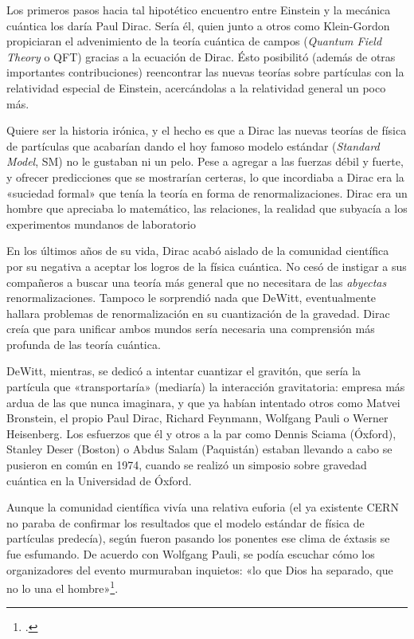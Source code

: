 \documentclass[11pt,a4paper,titlepage]{article}
\begin{document}
\par Los primeros pasos hacia tal hipotético encuentro entre Einstein y la mecánica cuántica los daría Paul Dirac. Sería él, quien junto a otros como Klein-Gordon propiciaran el advenimiento de la teoría cuántica de campos (\textit{Quantum Field Theory} o QFT) gracias a la ecuación de Dirac. Ésto posibilitó (además de otras importantes contribuciones) reencontrar las nuevas teorías sobre partículas con la relatividad especial de Einstein, acercándolas a la relatividad general un poco más.
\par Quiere ser la historia irónica, y el hecho es que a Dirac las nuevas teorías de física de partículas que acabarían dando el hoy famoso modelo estándar (\textit{Standard Model}, SM) no le gustaban ni un pelo. Pese a agregar a las fuerzas débil y fuerte, y ofrecer predicciones que se mostrarían certeras, lo que incordiaba a Dirac era la «suciedad formal» que tenía la teoría en forma de renormalizaciones. Dirac era un hombre que apreciaba lo matemático, las relaciones, la realidad que subyacía a los experimentos mundanos de laboratorio
\par En los últimos años de su vida, Dirac acabó aislado de la comunidad científica por su negativa a aceptar los logros de la física cuántica. No cesó de instigar a sus compañeros a buscar una teoría más general que no necesitara de las \textit{abyectas} renormalizaciones. Tampoco le sorprendió nada que DeWitt, eventualmente hallara problemas de renormalización en su cuantización de la gravedad. Dirac creía que para unificar ambos mundos sería necesaria una comprensión más profunda de las teoría cuántica.
\\\par DeWitt, mientras, se dedicó a intentar cuantizar el gravitón, que sería la partícula que «transportaría» (mediaría) la interacción gravitatoria: empresa más ardua de las que nunca imaginara, y que ya habían intentado otros como Matvei Bronstein, el propio Paul Dirac, Richard Feynmann, Wolfgang Pauli o Werner Heisenberg. Los esfuerzos que él y otros a la par como Dennis Sciama (Óxford), Stanley Deser (Boston) o Abdus Salam (Paquistán) estaban llevando a cabo se pusieron en común en 1974, cuando se realizó un simposio sobre gravedad cuántica en la Universidad de Óxford.
\par Aunque la comunidad científica vivía una relativa euforia (el ya existente CERN no paraba de confirmar los resultados que el modelo estándar de física de partículas predecía), según fueron pasando los ponentes ese clima de éxtasis se fue esfumando. De acuerdo con Wolfgang Pauli, se podía escuchar cómo los organizadores del evento murmuraban inquietos: «lo que Dios ha separado, que no lo una el hombre»\footnote{\cite[p.~242]{teoriaperfecta}.}.
\end{document}
